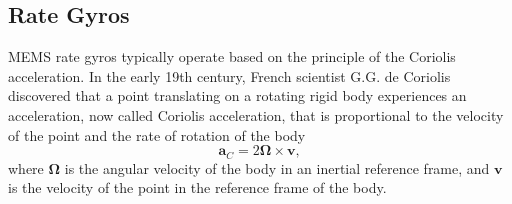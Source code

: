 %


\subsection{Rate Gyros}

MEMS rate gyros typically operate based on the principle of the Coriolis acceleration. In the early 19th century, French scientist G.G. de Coriolis discovered that a point translating on a rotating rigid body experiences an acceleration, now called Coriolis acceleration, that is proportional to the velocity of the point and the rate of rotation of the body
\begin{equation}
\mathbf{a}_C = 2\boldsymbol{\Omega} \times \mathbf{v} ,
\label{eq:sensors-aC}
\end{equation}
where $\boldsymbol{\Omega}$ is the angular velocity of the body in an inertial reference frame, and $\mathbf{v}$ is the velocity of the point in the reference frame of the body. 

